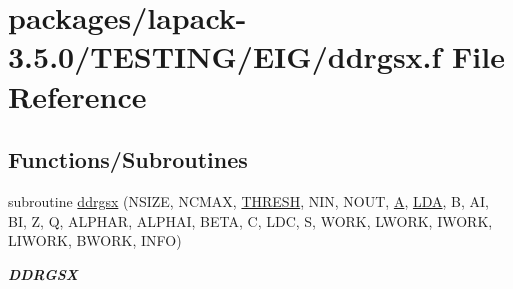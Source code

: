 \hypertarget{ddrgsx_8f}{}\section{packages/lapack-\/3.5.0/\+T\+E\+S\+T\+I\+N\+G/\+E\+I\+G/ddrgsx.f File Reference}
\label{ddrgsx_8f}
\subsection*{Functions/\+Subroutines}
\begin{DoxyCompactItemize}
\item 
subroutine \hyperlink{group__double__eig_ga5408eea13bb949e9ff502a7dfd447954}{ddrgsx} (N\+S\+I\+Z\+E, N\+C\+M\+A\+X, \hyperlink{zlaqgs_8c_a0656018abfc9fa2821827415f5d5ea57}{T\+H\+R\+E\+S\+H}, N\+I\+N, N\+O\+U\+T, \hyperlink{classA}{A}, \hyperlink{example__user_8c_ae946da542ce0db94dced19b2ecefd1aa}{L\+D\+A}, B, A\+I, B\+I, Z, Q, A\+L\+P\+H\+A\+R, A\+L\+P\+H\+A\+I, B\+E\+T\+A, C, L\+D\+C, S, W\+O\+R\+K, L\+W\+O\+R\+K, I\+W\+O\+R\+K, L\+I\+W\+O\+R\+K, B\+W\+O\+R\+K, I\+N\+F\+O)
\begin{DoxyCompactList}\small\item\em {\bfseries D\+D\+R\+G\+S\+X} \end{DoxyCompactList}\end{DoxyCompactItemize}
